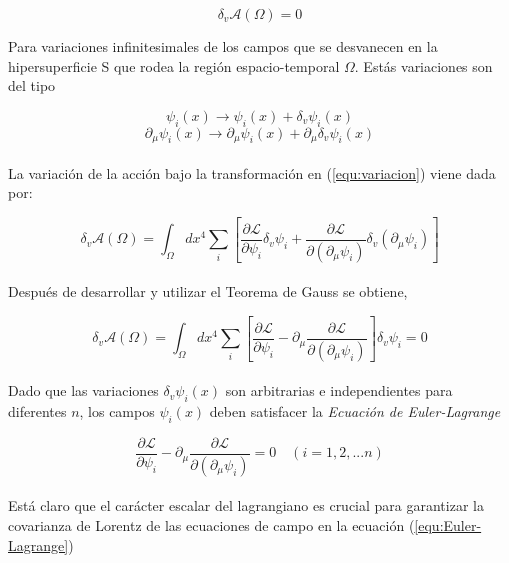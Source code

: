 \documentclass[12pt]{article}
\begin{document}
\begin{equation}
  \delta_v \mathcal{A}(\Omega)=0  
\end{equation}

Para variaciones infinitesimales de los campos que se desvanecen en la hipersuperficie S que rodea la región espacio-temporal $\Omega$. Estás variaciones son del tipo

\[ \psi_i(x) \rightarrow \psi_i(x) + \delta_v  \psi_i(x) \]
\begin{equation}
\partial_\mu\psi_i(x) \rightarrow \partial_\mu\psi_i(x) + \partial_\mu \delta_v  \psi_i(x)
\label{equ:variacion}
\end{equation} \\

La variación de la acción bajo la transformación en (\ref{equ:variacion}) viene dada por: 

%
\begin{equation}
  \delta_v \mathcal{A}(\Omega)=  \int_\Omega dx^4  \sum_{i}\left[\frac{\partial\mathcal{L}}{\partial\psi_i}\delta_v\psi_i + \frac{\partial\mathcal{L}}{\partial(\partial_\mu\psi_i)}\delta_v(\partial_\mu\psi_i)\right] 
\end{equation} \\

Después de desarrollar y utilizar el Teorema de Gauss se obtiene,

\begin{equation}
    \delta_v \mathcal{A}(\Omega)= \int_\Omega dx^4  \sum_{i}\left[\frac{\partial\mathcal{L}}{\partial\psi_i} - \partial_\mu  \frac{\partial\mathcal{L}}{\partial(\partial_\mu\psi_i)}\right]\delta_v\psi_i   =0
\end{equation} \\ 

Dado que las variaciones $\delta_v  \psi_i(x)$ son arbitrarias e independientes para diferentes $ n $, los campos $\psi_i(x)$ deben satisfacer la \textit{Ecuación de Euler-Lagrange } 
 
 \begin{equation}
\frac{\partial\mathcal{L}}{\partial\psi_i} - \partial_\mu  \frac{\partial\mathcal{L}}{\partial(\partial_\mu\psi_i)}=0 \quad (i=1,2,...n)
\label{equ:Euler-Lagrange}
 \end{equation} \\


 Está claro que el carácter escalar del lagrangiano es crucial para garantizar la covarianza de Lorentz de las ecuaciones de campo en la ecuación (\ref{equ:Euler-Lagrange})
 
\end{document}
